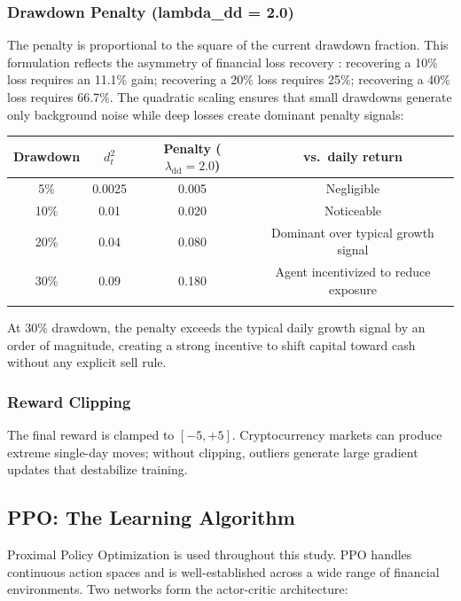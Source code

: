 \documentclass[pdflatex,sn-mathphys-num]{sn-jnl}
\begin{document}
\subsubsection{Drawdown Penalty (lambda\_dd = 2.0)}

The penalty is proportional to the square of the current drawdown fraction.
This formulation reflects the asymmetry of financial loss recovery
\cite{grossman1993portfolio}: recovering a 10\% loss requires an 11.1\% gain;
recovering a 20\% loss requires 25\%; recovering a 40\% loss requires 66.7\%.
The quadratic scaling ensures that small drawdowns generate only background
noise while deep losses create dominant penalty signals:

\begin{center}
\begin{tabular}{cccc}
\toprule
Drawdown & $d_t^2$ & Penalty ($\lambda_{\mathrm{dd}}=2.0$) & vs.\ daily return \\
\midrule
5\%  & 0.0025 & 0.005  & Negligible \\
10\% & 0.01   & 0.020  & Noticeable \\
20\% & 0.04   & 0.080  & Dominant over typical growth signal \\
30\% & 0.09   & 0.180  & Agent incentivized to reduce exposure \\
\botrule
\end{tabular}
\end{center}

At 30\% drawdown, the penalty exceeds the typical daily growth signal by an
order of magnitude, creating a strong incentive to shift capital toward cash
without any explicit sell rule.

\subsubsection{Reward Clipping}

The final reward is clamped to $[-5, +5]$. Cryptocurrency markets can
produce extreme single-day moves; without clipping, outliers generate large
gradient updates that destabilize training.

\subsection{PPO: The Learning Algorithm}\label{sec:ppo}

Proximal Policy Optimization \cite{schulman2017proximal} is used throughout
this study. PPO handles continuous action spaces and is well-established
across a wide range of financial environments. Two networks form the
actor-critic architecture:
\end{document}
